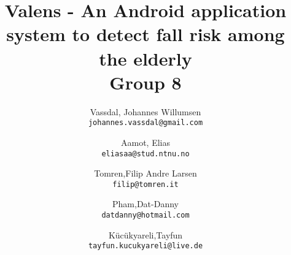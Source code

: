 \documentclass[12pt,a4paper,table]{report}
\title{Valens - An Android application system to detect fall risk among the elderly \\Group 8}
\author{
  Vassdal, Johannes Willumsen\\
  \texttt{johannes.vassdal@gmail.com}
  \and
  Aamot, Elias\\
  \texttt{eliasaa@stud.ntnu.no}
  \and
  Tomren,Filip Andre Larsen\\
  \texttt{filip@tomren.it}
    \and
  Pham,Dat-Danny\\
  \texttt{datdanny@hotmail.com}
    \and
  K\"{u}c\"{u}kyareli,Tayfun\\
  \texttt{tayfun.kucukyareli@live.de}
}
\begin{document}
\onehalfspacing
\maketitle
\tableofcontents












\end{document}
